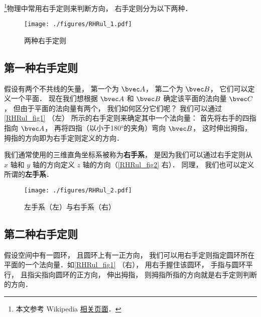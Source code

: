 

\footnote{本文参考 Wikipedia \href{https://en.wikipedia.org/wiki/Right-hand_rule}{相关页面}．}物理中常用右手定则来判断方向， 右手定则分为以下两种．

\begin{figure}[ht]
\centering
\texttt{[image: ./figures/RHRul\_1.pdf]}
\caption{两种右手定则} \label{RHRul_fig1}
\end{figure}

\subsection{第一种右手定则}
假设有两个不共线的矢量， 第一个为 $\bvec A$， 第二个为 $\bvec B$， 它们可以定义一个平面． 现在我们想根据 $\bvec A$ 和 $\bvec B$ 确定该平面的法向量 $\bvec C$， 但由于平面的法向量有两个， 我们如何区分它们呢？ 我们可以通过\autoref{RHRul_fig1} （左） 所示的右手定则来确定其中一个法向量： 首先将右手的四指指向 $\bvec A$， 再将四指（以小于180°的夹角）弯向 $\bvec B$， 这时伸出拇指， 拇指的方向即为右手定则定义的方向．

我们通常使用的三维直角坐标系被称为\textbf{右手系}， 是因为我们可以通过右手定则从 $x$ 轴和 $y$ 轴的方向定义 $z$ 轴的方向（\autoref{RHRul_fig2} 右）． 同理， 我们也可以定义所谓的\textbf{左手系}．

\begin{figure}[ht]
\centering
\texttt{[image: ./figures/RHRul\_2.pdf]}
\caption{左手系（左）与右手系（右）} \label{RHRul_fig2}
\end{figure}

\subsection{第二种右手定则}
假设空间中有一圆环， 且圆环上有一正方向， 我们可以用右手定则指定圆环所在平面的一个法向量．如\autoref{RHRul_fig1} （右）， 用右手握住该圆环， 手指与圆环平行， 且指尖指向圆环的正方向， 伸出拇指， 则拇指所指的方向就是右手定则判断的方向．

